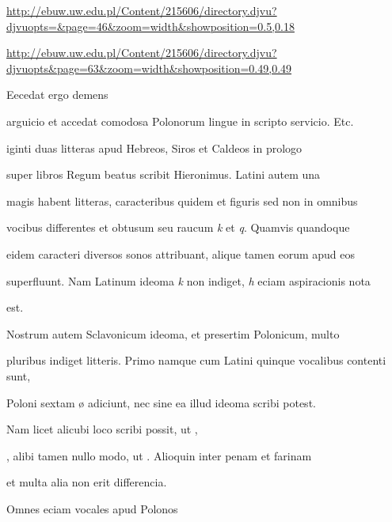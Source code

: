 
\newpage
\newParkoszpage

{
\url{http://ebuw.uw.edu.pl/Content/215606/directory.djvu?djvuopts=&page=46&zoom=width&showposition=0.5,0.18}

\url{http://ebuw.uw.edu.pl/Content/215606/directory.djvu?djvuopts&page=63&zoom=width&showposition=0.49,0.49}
}
\fullpreviouslines


{
\color{blue}

Eecedat ergo demens

}



\fulllines{}

arguicio et accedat comodosa Polonorum lingue in scripto servicio. Etc.

iginti duas litteras apud Hebreos, Siros et Caldeos in prologo

super libros Regum beatus scribit Hieronimus. Latini autem una

magis habent litteras, caracteribus quidem et figuris sed non in omnibus

vocibus differentes et obtusum seu raucum \textit{k} et \textit{q}. Quamvis quandoque

eidem caracteri diversos sonos attribuant, alique tamen eorum apud eos

superfluunt. Nam Latinum ideoma \textit{k} non indiget, \textit{h} eciam aspiracionis nota

\splitlines{}

est.

\indentK Nostrum autem Sclavonicum ideoma, et presertim Polonicum, multo

\fulllines{}

pluribus indiget litteris. Primo namque cum Latini quinque vocalibus contenti sunt,

Poloni  sextam ø adiciunt, nec sine ea illud ideoma scribi potest.

Nam licet alicubi loco   scribi possit, ut  , 

, alibi tamen nullo modo, ut  . Alioquin inter penam et farinam

\splitlines{}

et multa alia non erit differencia.

\indentK Omnes eciam vocales apud Polonos

